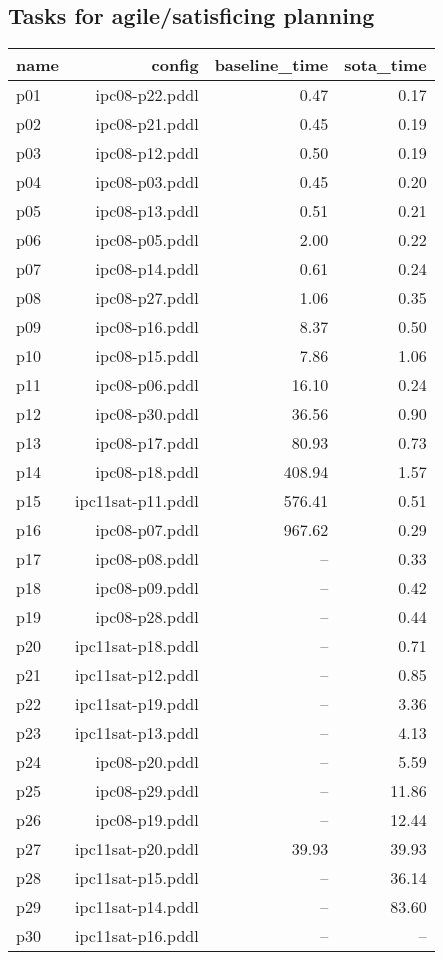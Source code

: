 \documentclass{article}
\begin{document}
                    \subsection*{Tasks for agile/satisficing planning}
                    
                            \begin{center}
                            \scriptsize
                            \begin{tabular}{@{}l|r|r|r@{}}
                            name & config & baseline\_time & sota\_time\\\midrule
                              p01& ipc08-p22.pddl&0.47&0.17\\
  p02& ipc08-p21.pddl&0.45&0.19\\
  p03& ipc08-p12.pddl&0.50&0.19\\
  p04& ipc08-p03.pddl&0.45&0.20\\
  p05& ipc08-p13.pddl&0.51&0.21\\
  p06& ipc08-p05.pddl&2.00&0.22\\
  p07& ipc08-p14.pddl&0.61&0.24\\
  p08& ipc08-p27.pddl&1.06&0.35\\
  p09& ipc08-p16.pddl&8.37&0.50\\
  p10& ipc08-p15.pddl&7.86&1.06\\
  p11& ipc08-p06.pddl&16.10&0.24\\
  p12& ipc08-p30.pddl&36.56&0.90\\
  p13& ipc08-p17.pddl&80.93&0.73\\
  p14& ipc08-p18.pddl&408.94&1.57\\
  p15& ipc11sat-p11.pddl&576.41&0.51\\
  p16& ipc08-p07.pddl&967.62&0.29\\
  p17& ipc08-p08.pddl&--&0.33\\
  p18& ipc08-p09.pddl&--&0.42\\
  p19& ipc08-p28.pddl&--&0.44\\
  p20& ipc11sat-p18.pddl&--&0.71\\
  p21& ipc11sat-p12.pddl&--&0.85\\
  p22& ipc11sat-p19.pddl&--&3.36\\
  p23& ipc11sat-p13.pddl&--&4.13\\
  p24& ipc08-p20.pddl&--&5.59\\
  p25& ipc08-p29.pddl&--&11.86\\
  p26& ipc08-p19.pddl&--&12.44\\
  p27& ipc11sat-p20.pddl&39.93&39.93\\
  p28& ipc11sat-p15.pddl&--&36.14\\
  p29& ipc11sat-p14.pddl&--&83.60\\
  p30& ipc11sat-p16.pddl&--&--
                            \end{tabular}
                            \end{center}
                    
\end{document}
